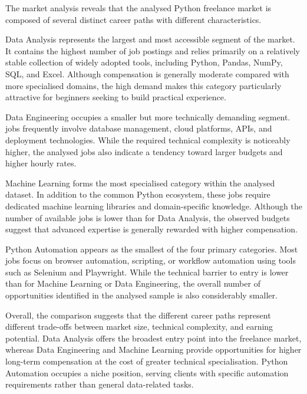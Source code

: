 The market analysis reveals that the analysed Python freelance market is composed of several distinct career paths with different characteristics.

Data Analysis represents the largest and most accessible segment of the market. It contains the highest number of job postings and relies primarily on a
relatively stable collection of widely adopted tools, including Python, Pandas, NumPy, SQL, and Excel. Although compensation is generally moderate compared with
more specialised domains, the high demand makes this category particularly attractive for beginners seeking to build practical experience.

Data Engineering occupies a smaller but more technically demanding segment. jobs frequently involve database management, cloud platforms, APIs, and
deployment technologies. While the required technical complexity is noticeably higher, the analysed jobs also indicate a tendency toward larger budgets and
higher hourly rates.

Machine Learning forms the most specialised category within the analysed dataset. In addition to the common Python ecosystem, these jobs require dedicated
machine learning libraries and domain-specific knowledge. Although the number of available jobs is lower than for Data Analysis, the observed budgets suggest
that advanced expertise is generally rewarded with higher compensation.

Python Automation appears as the smallest of the four primary categories. Most jobs focus on browser automation, scripting, or workflow automation using
tools such as Selenium and Playwright. While the technical barrier to entry is lower than for Machine Learning or Data Engineering, the overall number of
opportunities identified in the analysed sample is also considerably smaller.

Overall, the comparison suggests that the different career paths represent different trade-offs between market size, technical complexity, and earning potential.
Data Analysis offers the broadest entry point into the freelance market, whereas Data Engineering and Machine Learning provide opportunities for higher long-term
compensation at the cost of greater technical specialisation. Python Automation occupies a niche position, serving clients with specific automation requirements
rather than general data-related tasks.

